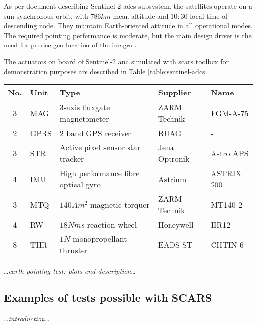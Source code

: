     As per document describing Sentinel-2 \ac{adcs} subsystem, the satellites operate on a sun-synchronous orbit, with $786km$ mean altitude and $10:30$ local time of descending node. They maintain Earth-oriented attitude in all operational modes. The required pointing performance is moderate, but the main design driver is the need for precise geo-location of the images \cite{sentinelreference_adcs}.

    The actuators on board of Sentinel-2 and simulated with \ac{scars} toolbox for demonstration purposes are described in Table \ref{table:sentinel-adcs}.

        
    \begin{center}    
        \small
        \begin{tabularx}{\textwidth}{ c l X l l }
            \textbf{No.} & \textbf{Uni}t & \textbf{Type} & \textbf{Supplier} & \textbf{Name} \\ \hline
            3 & MAG & 3-axis fluxgate magnetometer & ZARM Technik & FGM-A-75 \\
            2 & GPRS & 2 band GPS receiver & RUAG & - \\
            3 & STR  & Active pixel sensor star tracker & Jena Optronik & Astro APS \\
            4 & IMU & High performance fibre optical gyro & Astrium & ASTRIX 200 \\
            3 & MTQ & $140 Am^2$ magnetic torquer & ZARM Technik & MT140-2\\
            4 & RW & $18 Nms$ reaction wheel & Honeywell & HR12 \\
            8 & THR & $1N$ monopropellant thruster & EADS ST &CHTIN-6
        \end{tabularx}
    \end{center}\label{table:sentinel-adcs}

    \dots\textit{earth-pointing test: plots and description}\dots

\subsection{Examples of tests possible with SCARS}
    \dots\textit{introduction}\dots

